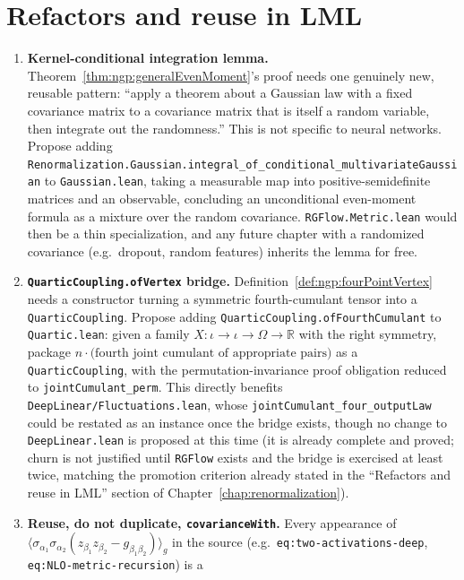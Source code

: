 \section{Refactors and reuse in LML}
\label{sec:ngp:refactors}

\begin{enumerate}
  \item \textbf{Kernel-conditional integration lemma.} Theorem~\ref{thm:ngp:generalEvenMoment}'s
    proof needs one genuinely new, reusable pattern: ``apply a theorem about a Gaussian law with a
    fixed covariance matrix to a covariance matrix that is itself a random variable, then integrate
    out the randomness.'' This is not specific to neural networks. Propose adding
    \texttt{Renormalization.Gaussian.integral\_of\_conditional\_multivariateGaussian} to
    \texttt{Gaussian.lean}, taking a measurable map into positive-semidefinite matrices and an
    observable, concluding an unconditional even-moment formula as a mixture over the random
    covariance. \texttt{RGFlow.Metric.lean} would then be a thin specialization, and any future
    chapter with a randomized covariance (e.g.\ dropout, random features) inherits the lemma for
    free.
  \item \textbf{\texttt{QuarticCoupling.ofVertex} bridge.} Definition~\ref{def:ngp:fourPointVertex}
    needs a constructor turning a symmetric fourth-cumulant tensor into a
    \texttt{QuarticCoupling}. Propose adding \texttt{QuarticCoupling.ofFourthCumulant} to
    \texttt{Quartic.lean}: given a family $X:\iota\to\iota\to\Omega\to\mathbb R$ with the right
    symmetry, package $n\cdot\text{(fourth joint cumulant of appropriate pairs)}$ as a
    \texttt{QuarticCoupling}, with the permutation-invariance proof obligation reduced to
    \texttt{jointCumulant\_perm}. This directly benefits \texttt{DeepLinear/Fluctuations.lean},
    whose \texttt{jointCumulant\_four\_outputLaw} could be restated as an instance once the bridge
    exists, though no change to \texttt{DeepLinear.lean} is proposed at this time (it is already
    complete and proved; churn is not justified until \texttt{RGFlow} exists and the bridge is
    exercised at least twice, matching the promotion criterion already stated in the
    ``Refactors and reuse in LML'' section of Chapter~\ref{chap:renormalization}).
  \item \textbf{Reuse, do not duplicate, \texttt{covarianceWith}.} Every appearance of
    $\langle\sigma_{\alpha_1}\sigma_{\alpha_2}(z_{\beta_1}z_{\beta_2}-g_{\beta_1\beta_2})\rangle_g$
    in the source (e.g.\ \texttt{eq:two-activations-deep}, \texttt{eq:NLO-metric-recursion}) is a

\end{enumerate}
